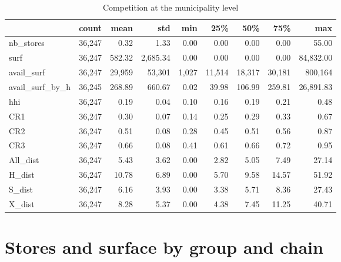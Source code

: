 \documentclass[11pt]{article}
\begin{document}
\begin{table}[H]
\caption{Competition at the municipality level}
\small
\begin{tabular}{lrrrrrrrr}
\toprule
{} &      count &       mean &        std &        min &        25\% &        50\% &        75\% &        max \\
\midrule
nb\_stores       &  36,247 &       0.32 &       1.33 &       0.00 &       0.00 &       0.00 &       0.00 &      55.00 \\
surf            &  36,247 &     582.32 &   2,685.34 &       0.00 &       0.00 &       0.00 &       0.00 &  84,832.00 \\
avail\_surf      &  36,247 &  29,959 &  53,301 &   1,027 &  11,514 &  18,317 &  30,181 & 800,164 \\
avail\_surf\_by\_h &  36,245 &     268.89 &     660.67 &       0.02 &      39.98 &     106.99 &     259.81 &  26,891.83 \\
hhi             &  36,247 &       0.19 &       0.04 &       0.10 &       0.16 &       0.19 &       0.21 &       0.48 \\
CR1             &  36,247 &       0.30 &       0.07 &       0.14 &       0.25 &       0.29 &       0.33 &       0.67 \\
CR2             &  36,247 &       0.51 &       0.08 &       0.28 &       0.45 &       0.51 &       0.56 &       0.87 \\
CR3             &  36,247 &       0.66 &       0.08 &       0.41 &       0.61 &       0.66 &       0.72 &       0.95 \\
All\_dist        &  36,247 &       5.43 &       3.62 &       0.00 &       2.82 &       5.05 &       7.49 &      27.14 \\
H\_dist          &  36,247 &      10.78 &       6.89 &       0.00 &       5.70 &       9.58 &      14.57 &      51.92 \\
S\_dist          &  36,247 &       6.16 &       3.93 &       0.00 &       3.38 &       5.71 &       8.36 &      27.43 \\
X\_dist          &  36,247 &       8.28 &       5.37 &       0.00 &       4.38 &       7.45 &      11.25 &      40.71 \\
\bottomrule
\end{tabular}

\end{table}

\section{Stores and surface by group and chain}
\end{document}
